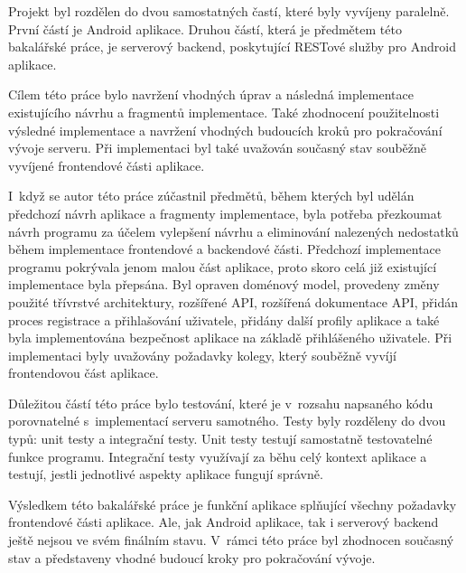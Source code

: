 Projekt byl rozdělen do dvou samostatných častí, které byly vyvíjeny paralelně. První částí je Android aplikace. Druhou částí, která je předmětem této bakalářské práce, je serverový backend, poskytující RESTové služby pro Android aplikace.

Cílem této práce bylo navržení vhodných úprav a následná implementace existujícího návrhu a fragmentů implementace. Také zhodnocení použitelnosti výsledné implementace a navržení vhodných budoucích kroků pro pokračování vývoje serveru. Při implementaci byl také uvažován současný stav souběžně vyvíjené frontendové části aplikace.

I~když se autor této práce zúčastnil předmětů, během kterých byl udělán předchozí návrh aplikace a fragmenty implementace, byla potřeba přezkoumat návrh programu za účelem vylepšení návrhu a eliminování nalezených nedostatků během implementace frontendové a backendové části. Předchozí implementace programu pokrývala jenom malou část aplikace, proto skoro celá již existující implementace byla přepsána. Byl opraven doménový model, provedeny změny použité třívrstvé architektury, rozšířené API, rozšířená dokumentace API, přidán proces registrace a přihlašování uživatele, přidány další profily aplikace a také byla implementována bezpečnost aplikace na základě přihlášeného uživatele. Při implementaci byly uvažovány požadavky kolegy, který souběžně vyvíjí frontendovou část aplikace.

Důležitou částí této práce bylo testování, které je v~rozsahu napsaného kódu porovnatelné s~implementací serveru samotného. Testy byly rozděleny do dvou typů: unit testy a integrační testy. Unit testy testují samostatně testovatelné funkce programu. Integrační testy využívají za běhu celý kontext aplikace a testují, jestli jednotlivé aspekty aplikace fungují správně. 

Výsledkem této bakalářské práce je funkční aplikace splňující všechny požadavky frontendové části aplikace. Ale, jak Android aplikace, tak i serverový backend ještě nejsou ve svém finálním stavu. V~rámci této práce byl zhodnocen současný stav a představeny vhodné budoucí kroky pro pokračování vývoje.
